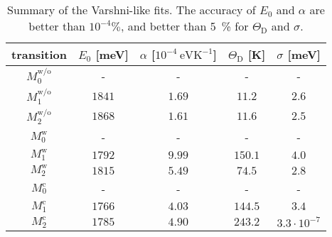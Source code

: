 \begin{table}
	\centering
	\caption{Summary of the Varshni-like fits. The accuracy of $E_0$ and $\alpha$ are better than $10^{-4}\%$, and better than 5~\% for $\Theta_\mathrm{D}$ and $\sigma$.}
	\begin{tabularx}{0.9\textwidth}{cCCcc}
		\toprule
		
		transition & $E_0$ [meV]& $\alpha$ [$10^{-4}~\mathrm{eVK^{-1}}$]& $\Theta_\mathrm{D}$ [K]& $\sigma$ [meV]\\ 	
		\midrule
		\midrule
		$M_0^\mathrm{w/o}$& - & -& -&-\\
		$M_1^\mathrm{w/o}$& $1841$ & $1.69$& $11.2$&$2.6$\\
		$M_2^\mathrm{w/o}$ & $1868$ & $1.61$& $11.6$& $2.5$\\ 
		
		\midrule
		$M_0^\mathrm{w}$& - & -& -&-\\
		$M_1^\mathrm{w}$& $1792$ & $9.99$& $150.1$&$4.0$\\
		$M_2^\mathrm{w}$ & $1815$& $5.49$& $74.5$& $2.8$\\ 
		
		\midrule
		$M_0^\mathrm{c}$& - & -& -&-\\
		$M_1^\mathrm{c}$& $1766$ & $4.03$& $144.5$& $3.4$\\
		$M_2^\mathrm{c}$ & $1785$ & $4.90$& $243.2$& $3.3\cdot 10^{-7}$\\
		
		\bottomrule
	\end{tabularx}\label{tab:Varshni}
\end{table}

